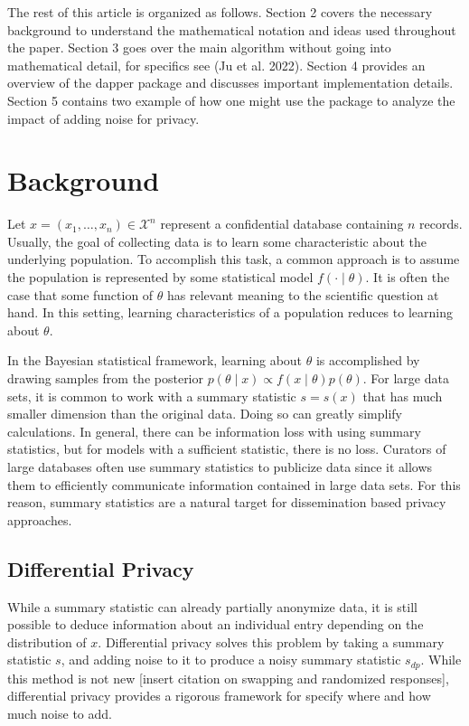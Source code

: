 The rest of this article is organized as follows. Section 2 covers the necessary background to understand the mathematical notation
and ideas used throughout the paper. Section 3 goes over the main algorithm without
going into mathematical detail, for specifics see (Ju et al. 2022). Section 4 provides
an overview of the dapper package and discusses important implementation details.
Section 5 contains two example of how one might use the package to analyze the
impact of adding noise for privacy.

\hypertarget{background}{%
\section{Background}\label{background}}

Let \(x = (x_1, \ldots, x_n) \in \mathcal{X}^n\) represent a confidential
database containing \(n\) records. Usually, the goal of collecting data
is to learn some characteristic about the underlying population.
To accomplish this task, a common approach is to assume the population
is represented by some statistical model \(f( \cdot \mid \theta)\). It is often the case that
some function of \(\theta\) has relevant meaning to the scientific question at hand. In this setting,
learning characteristics of a population reduces to learning about \(\theta\).

In the Bayesian statistical framework, learning about \(\theta\) is accomplished by drawing samples from the
posterior \(p(\theta \mid x) \propto f(x \mid \theta) p(\theta)\). For
large data sets, it is common to work with a summary statistic \(s = s(x)\)
that has much smaller dimension than the original data. Doing so can
greatly simplify calculations. In general, there can be information
loss with using summary statistics, but for models with a sufficient
statistic, there is no loss. Curators of large databases
often use summary statistics to publicize data since it allows them
to efficiently communicate information contained in large data sets.
For this reason, summary statistics are a natural target for
dissemination based privacy approaches.

\hypertarget{differential-privacy}{%
\subsection{Differential Privacy}\label{differential-privacy}}

While a summary statistic can already partially anonymize data, it is still
possible to deduce information about an individual entry depending on
the distribution of \(x\). Differential privacy
solves this problem by taking a summary statistic \(s\), and adding noise to it to produce a noisy summary statistic \(s_{dp}\).
While this method is not new {[}insert citation on swapping and randomized responses{]}, differential privacy
provides a rigorous framework for specify where and how much
noise to add.

